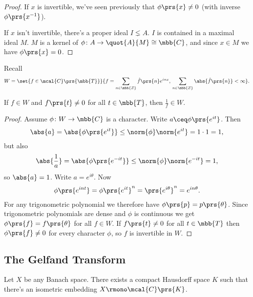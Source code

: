\documentclass[10pt, twoside]{book}
\begin{document}
\begin{proof}
If $x$ is invertible, we've seen previously that $\phi\prs{x} \neq 0$ (with inverse $\phi\prs{x^{-1}}$).

If $x$ isn't invertible, there's a proper ideal $I \lneq A$. $I$ is contained in a maximal ideal $M$. $M$ is a kernel of $\phi \colon A \to \quot{A}{M} \cong \mbb{C}$, and since $x \in M$ we have $\phi\prs{x} = 0$.
\end{proof}

Recall
\[W = \set{f \in \mcal{C}\prs{\mbb{T}}}{f = \sum_{n \in \mbb{Z}} \hat{f}\prs{n} e^{i n x}, \, \sum_{n \in \mbb{Z}} \abs{\hat{f}\prs{n}} < \infty} \text{.}\]

\begin{theorem}[Wiener]
If $f \in W$ and $f\prs{t} \neq 0$ for all $t \in \mbb{T}$, then $\frac{1}{f} \in W$.
\end{theorem}

\begin{proof}
Assume $\phi \colon W \to \mbb{C}$ is a character. Write $a \ceq \phi\prs{e^{it}}$. Then
\begin{align*}
\abs{a} = \abs{\phi\prs{e^{it}}} \leq \norm{\phi} \norm{e^{it}} = 1 \cdot 1 = 1 \text{,}
\end{align*}
but also
\begin{align*}
\abs{\frac{1}{a}} = \abs{\phi\prs{e^{-it}}} \leq \norm{\phi} \norm{e^{-it}} = 1 \text{,}
\end{align*}
so $\abs{a} = 1$. Write $a = e^{i \theta}$.
Now
\begin{align*}
\phi\prs{e^{int}} = \phi\prs{e^{it}}^n = \prs{e^{i \theta}}^n = e^{i n \theta} \text{.}
\end{align*}
For any trigonometric polynomial we therefore have $\phi\prs{p} = p\prs{\theta}$. Since trigonometric polynomials are dense and $\phi$ is continuous we get $\phi\prs{f} = f\prs{\theta}$ for all $f \in W$.
If $f\prs{t} \neq 0$ for all $t \in \mbb{T}$ then $\phi\prs{f} \neq 0$ for every character $\phi$, so $f$ is invertible in $W$.
\end{proof}

\subsection{The Gelfand Transform}

\begin{proposition}
Let $X$ be any Banach space. There exists a compact Hausdorff space $K$ such that there's an isometric embedding $X \rmono \mcal{C}\prs{K}$.
\end{proposition}
\end{document}
